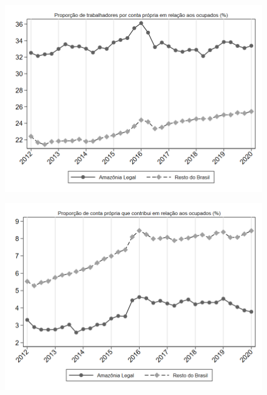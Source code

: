 \begin{frame}[label=_estrutura_emprego_prop_cpropria]{}
\textit{\hyperlink{_estrutura_emprego}{}}
\begin{figure}
  \centering
  \includegraphics[width=1.0\linewidth]{../../analysis/output/estrutura_emprego/_estrutura_emprego_prop_cpropria.png}
  \caption{}
  \label{fig:_estrutura_emprego_prop_cpropria}
\end{figure}
\end{frame}

\begin{frame}[label=_estrutura_emprego_prop_cpropriaC]{}
\textit{\hyperlink{_estrutura_emprego}{}}
\begin{figure}
  \centering
  \includegraphics[width=1.0\linewidth]{../../analysis/output/estrutura_emprego/_estrutura_emprego_prop_cpropriaC.png}
  \caption{}
  \label{fig:_estrutura_emprego_prop_cpropriaC}
\end{figure}
\end{frame}

